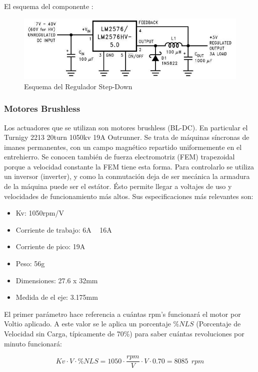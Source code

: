 \documentclass[twoside,11pt]{book}
\begin{document}
El esquema del componente \cite{lm2576s}:

\begin{figure}[h!]
\begin{center}
\includegraphics[scale=0.55,bb=0 0 570 192]{images/lm2576s.png} 
\caption{Esquema del Regulador Step-Down}
\end{center}
\end{figure}


\subsubsection*{Motores Brushless}
Los actuadores que se utilizan son motores brushless (BL-DC). En particular el Turnigy 2213 20turn 1050kv 19A Outrunner.
Se trata de máquinas síncronas de imanes permanentes, con un campo magnético repartido uniformemente en el entrehierro. Se conocen también de fuerza electromotriz (FEM) trapezoidal porque a velocidad constante la FEM tiene esta forma. 
Para controlarlo se utiliza un inversor (inverter), y como la conmutación deja de ser mecánica la armadura de la máquina puede ser el estátor. Ésto permite llegar a voltajes de uso y velocidades de funcionamiento más altos.
Sus especificaciones más relevantes son:
\begin{itemize}
\item Kv: 1050rpm/V
\item Corriente de trabajo: 6A ~ 16A
\item Corriente de pico: 19A
\item Peso: 56g
\item Dimensiones: 27.6 x 32mm
\item Medida de el eje: 3.175mm
\end{itemize}

El primer parámetro hace referencia a cuántas rpm's funcionará el motor por Voltio aplicado. A este valor se le aplica un porcentaje $\%NLS$ (Porcentaje de Velocidad sin Carga, típicamente de 70\%) para saber cuántas revoluciones por minuto funcionará:

\begin{equation}
Kv  \cdot V \cdot \%NLS = 1050 \cdot \frac{rpm}{V}\cdot V \cdot 0.70 = 8085 \>\> rpm
\end{equation}
\end{document}
